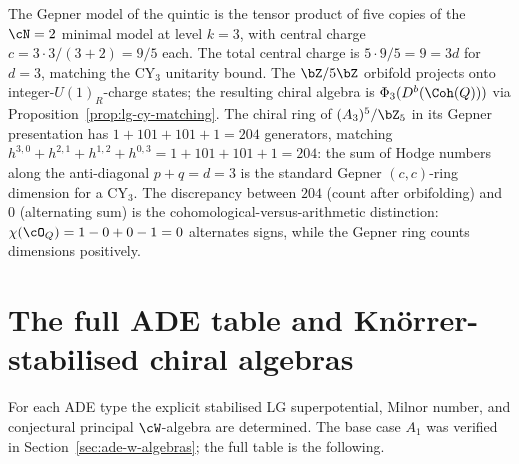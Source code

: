 \begin{example}
\label{ex:quintic-gepner-orbifold}
The Gepner model of the quintic is the tensor product of five copies of the $\cN = 2$ minimal model at level $k = 3$, with central charge $c = 3 \cdot 3/(3 + 2) = 9/5$ each. The total central charge is $5 \cdot 9/5 = 9 = 3d$ for $d = 3$, matching the CY$_3$ unitarity bound. The $\bZ/5\bZ$ orbifold projects onto integer-$U(1)_R$-charge states; the resulting chiral algebra is $\Phi_3(D^b(\Coh(Q)))$ via Proposition~\ref{prop:lg-cy-matching}. The chiral ring of $(A_3)^5/\bZ_5$ in its Gepner presentation has $1 + 101 + 101 + 1 = 204$ generators, matching $h^{3,0} + h^{2,1} + h^{1,2} + h^{0,3} = 1 + 101 + 101 + 1 = 204$: the sum of Hodge numbers along the anti-diagonal $p + q = d = 3$ is the standard Gepner $(c,c)$-ring dimension for a CY$_3$. The discrepancy between $204$ (count after orbifolding) and $0$ (alternating sum) is the cohomological-versus-arithmetic distinction: $\chi(\cO_Q) = 1 - 0 + 0 - 1 = 0$ alternates signs, while the Gepner ring counts dimensions positively.
\end{example}

\section{The full ADE table and Kn\"orrer-stabilised chiral algebras}
\label{sec:ade-table-stabilised}

For each ADE type the explicit stabilised LG superpotential, Milnor number, and conjectural principal $\cW$-algebra are determined. The base case $A_1$ was verified in Section~\ref{sec:ade-w-algebras}; the full table is the following.

